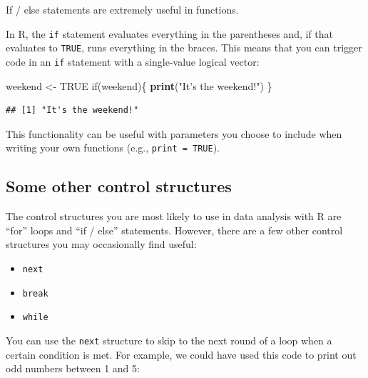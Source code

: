 \documentclass[]{book}
\makeatletter
\newenvironment{Shaded}{\begin{snugshade}}{\end{snugshade}}
\newcommand{\KeywordTok}[1]{\textcolor[rgb]{0.13,0.29,0.53}{\textbf{{#1}}}}
\newcommand{\DecValTok}[1]{\textcolor[rgb]{0.00,0.00,0.81}{{#1}}}
\newcommand{\StringTok}[1]{\textcolor[rgb]{0.31,0.60,0.02}{{#1}}}
\newcommand{\OtherTok}[1]{\textcolor[rgb]{0.56,0.35,0.01}{{#1}}}
\newcommand{\NormalTok}[1]{{#1}}
\providecommand{\tightlist}{%
  \setlength{\itemsep}{0pt}\setlength{\parskip}{0pt}}
\newenvironment{kframe}{%
\medskip{}
\setlength{\fboxsep}{.8em}
 \def\at@end@of@kframe{}%
 \ifinner\ifhmode%
  \def\at@end@of@kframe{\end{minipage}}%
  \begin{minipage}{\columnwidth}%
 \fi\fi%
 \def\FrameCommand##1{\hskip\@totalleftmargin \hskip-\fboxsep
 \colorbox{shadecolor}{##1}\hskip-\fboxsep
     \hskip-\linewidth \hskip-\@totalleftmargin \hskip\columnwidth}%
 \MakeFramed {\advance\hsize-\width
   \@totalleftmargin\z@ \linewidth\hsize
   \@setminipage}}%
 {\par\unskip\endMakeFramed%
 \at@end@of@kframe}
\renewenvironment{Shaded}{\begin{kframe}}{\end{kframe}}
\makeatother
\begin{document}
If / else statements are extremely useful in functions. \bigskip

In R, the \texttt{if} statement evaluates everything in the parentheses
and, if that evaluates to \texttt{TRUE}, runs everything in the braces.
This means that you can trigger code in an \texttt{if} statement with a
single-value logical vector:

\begin{Shaded}
\begin{Highlighting}[]
\NormalTok{weekend <-}\StringTok{ }\OtherTok{TRUE}
\NormalTok{if(weekend)\{}
  \KeywordTok{print}\NormalTok{(}\StringTok{"It's the weekend!"}\NormalTok{)}
\NormalTok{\}}
\end{Highlighting}
\end{Shaded}

\begin{verbatim}
## [1] "It's the weekend!"
\end{verbatim}

This functionality can be useful with parameters you choose to include
when writing your own functions (e.g., \texttt{print\ =\ TRUE}).

\subsection{Some other control
structures}\label{some-other-control-structures}

The control structures you are most likely to use in data analysis with
R are ``for'' loops and ``if / else'' statements. However, there are a
few other control structures you may occasionally find useful:

\begin{itemize}
\tightlist
\item
  \texttt{next}
\item
  \texttt{break}
\item
  \texttt{while}
\end{itemize}

You can use the \texttt{next} structure to skip to the next round of a
loop when a certain condition is met. For example, we could have used
this code to print out odd numbers between 1 and 5:

\begin{Shaded}
\end{Shaded}
\end{document}
